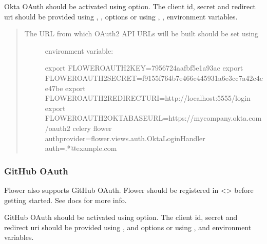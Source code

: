 \documentclass[letterpaper,10pt,english]{sphinxmanual}
\begin{document}
Okta OAuth should be activated using  option.
The client id, secret and redirect uri should be provided using
, ,  options or using
, ,  environment variables.
\begin{quote}
\begin{description}
\item[{The URL from which OAuth2 API URLs will be built should be set using }] \leavevmode
environment variable:

\begin{sphinxVerbatim}[commandchars=\\\{\}]
\PYGZdl{} export FLOWER\PYGZus{}OAUTH2\PYGZus{}KEY=7956724aafbf5e1a93ac
\PYGZdl{} export FLOWER\PYGZus{}OAUTH2\PYGZus{}SECRET=f9155f764b7e466c445931a6e3cc7a42c4ce47be
\PYGZdl{} export FLOWER\PYGZus{}OAUTH2\PYGZus{}REDIRECT\PYGZus{}URI=http://localhost:5555/login
\PYGZdl{} export FLOWER\PYGZus{}OAUTH2\PYGZus{}OKTA\PYGZus{}BASE\PYGZus{}URL=https://my\PYGZhy{}company.okta.com/oauth2
\PYGZdl{} celery flower \PYGZhy{}\PYGZhy{}auth\PYGZus{}provider=flower.views.auth.OktaLoginHandler \PYGZhy{}\PYGZhy{}auth=.*@example\PYGZbs{}.com
\end{sphinxVerbatim}

\end{description}
\end{quote}


\subsubsection{GitHub OAuth}
\label{\detokenize{auth:id2}}
Flower also supports GitHub OAuth. Flower should be registered in
\textless{}\textgreater{} before getting started.
See  docs for more info.

GitHub OAuth should be activated using  option.
The client id, secret and redirect uri should be provided using
,  and  options or using
,  and 
environment variables.
\end{document}
